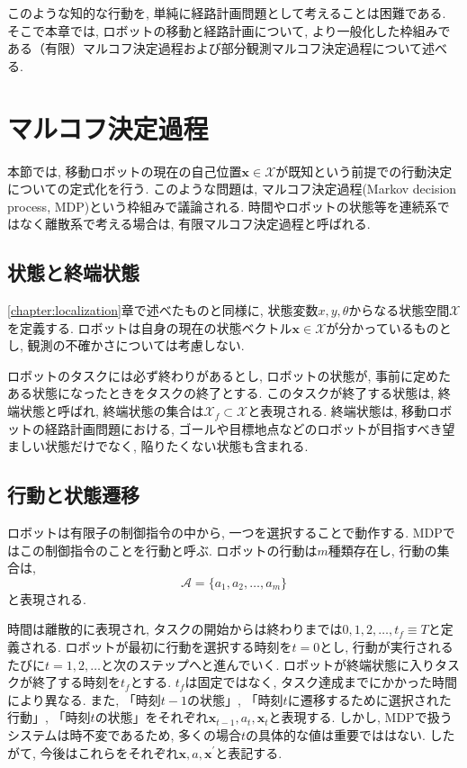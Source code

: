 このような知的な行動を, 単純に経路計画問題として考えることは困難である. 
そこで本章では, ロボットの移動と経路計画について, 
より一般化した枠組みである（有限）マルコフ決定過程および部分観測マルコフ決定過程について述べる. 



\section{マルコフ決定過程} \label{section:mdp}
本節では, 移動ロボットの現在の自己位置$\bm{x} \in \mathcal{X}$が既知という前提での行動決定についての定式化を行う. 
このような問題は, マルコフ決定過程(Markov decision process, MDP)という枠組みで議論される. 
時間やロボットの状態等を連続系ではなく離散系で考える場合は, 有限マルコフ決定過程と呼ばれる. 

\subsection{状態と終端状態}
\ref{chapter:localization}章で述べたものと同様に, 
状態変数$x,y,\theta$からなる状態空間$\mathcal{X}$を定義する. 
ロボットは自身の現在の状態ベクトル$\bm{x} \in \mathcal{X}$が分かっているものとし, 観測の不確かさについては考慮しない. 

ロボットのタスクには必ず終わりがあるとし, 
ロボットの状態が, 事前に定めたある状態になったときをタスクの終了とする. 
このタスクが終了する状態は, 終端状態と呼ばれ, 終端状態の集合は$\mathcal{X}_f \subset \mathcal{X}$と表現される. 
終端状態は, 移動ロボットの経路計画問題における, ゴールや目標地点などのロボットが目指すべき望ましい状態だけでなく, 陥りたくない状態も含まれる. 

\subsection{行動と状態遷移}
ロボットは有限子の制御指令の中から, 一つを選択することで動作する. 
MDPではこの制御指令のことを行動と呼ぶ. 
ロボットの行動は$m$種類存在し, 行動の集合は, 
\begin{equation}
\label{action}
  \mathcal{A} = \{ a_{1}, a_{2}, \ldots , a_{m} \}
\end{equation}
と表現される. 

時間は離散的に表現され, タスクの開始からは終わりまでは${0,1,2,\ldots,t_{f}} \equiv T$と定義される. 
ロボットが最初に行動を選択する時刻を$t=0$とし, 行動が実行されるたびに$t=1,2,\ldots$と次のステップへと進んでいく. 
ロボットが終端状態に入りタスクが終了する時刻を$t_{f}$とする. 
$t_{f}$は固定ではなく, タスク達成までにかかった時間により異なる. 
また, 「時刻$t-1$の状態」, 「時刻$t$に遷移するために選択された行動」, 「時刻$t$の状態」をそれぞれ$\bm{x}_{t-1}, a_{t}, \bm{x}_{t}$と表現する. 
しかし, MDPで扱うシステムは時不変であるため, 多くの場合$t$の具体的な値は重要でははない. 
したがて, 今後はこれらをそれぞれ$\bm{x}, a, \bm{x}^{'}$と表記する. 

